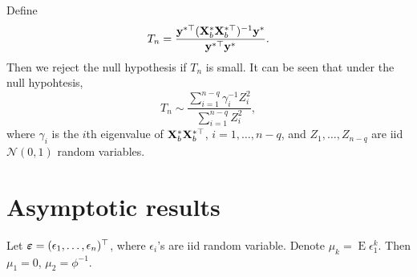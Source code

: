 \documentclass[11pt]{article}
\DeclareMathOperator{\myE}{E}
\newcommand{\By}{\mathbf{y}}    \newcommand{\Bz}{\mathbf{z}}
\theoremstyle{plain}
\theoremstyle{definition}
\theoremstyle{remark}
\begin{document}
Define
\begin{equation*}
    T_n= \frac{\By^{*\top} ( \BX_b^* \BX_b^{*\top} )^{-1} \By^* }{\By^{*\top} \By^*} .
\end{equation*}
Then we reject the null hypothesis if $T_n$ is small.
It can be seen that under the null hypohtesis,
\begin{equation*}
    T_n \sim
    \frac{\sum_{i=1}^{n-q} \gamma_i^{-1} Z_i^2}{\sum_{i=1}^{n-q} Z_i^2},
    \end{equation*}
    where $\gamma_i$ is the $i$th eigenvalue of $  \mathbf{X}_b^* \mathbf{X}_b^{*\top}$, $i=1,\ldots, n-q$, and $Z_1,\ldots, Z_{n-q}$ are iid $\mathcal N(0,1)$ random variables.




\section{Asymptotic results}
Let $\boldsymbol{\varepsilon}=(\epsilon_1,\ldots,\epsilon_n)^\top$, where $\epsilon_i$'s are iid random variable.
Denote $\mu_k=\myE \epsilon_1^k$.
Then $\mu_1=0$, $\mu_2=\phi^{-1}$.
\end{document}

